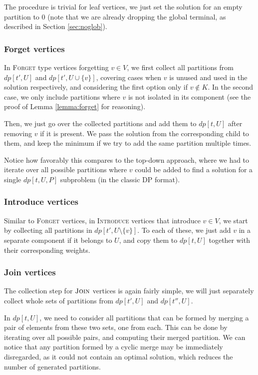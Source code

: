 \documentclass[thesis=M,english,hidelinks]{FITthesis}[2012/10/20]
\theoremstyle{definition}
\begin{document}
The procedure is trivial for leaf vertices, we just set the solution for an empty partition to 0 (note that we are
already dropping the global terminal, as described in Section \ref{sec:noglob}).

\subsubsection*{Forget vertices}

In \textsc{Forget} type vertices forgetting $v \in V$, we first collect all partitions from $dp[t', U]$ and $dp[t', U
\cup \{v\}]$, covering cases when $v$ is unused and used in the solution respectively, and considering the first option
only if $v \notin K$. In the second case, we only include partitions where $v$ is not isolated in its component (see the
proof of Lemma \ref{lemma:forget} for reasoning).

Then, we just go over the collected partitions and add them to $dp[t, U]$ after removing $v$ if it is present. We pass
the solution from the corresponding child to them, and keep the minimum if we try to add the same partition multiple
times.

Notice how favorably this compares to the top-down approach, where we had to iterate over all possible partitions where
$v$ could be added to find a solution for a single $dp[t, U, P]$ subproblem (in the classic DP format).

\subsubsection*{Introduce vertices}

Similar to \textsc{Forget} vertices, in \textsc{Introduce} vertices that introduce $v \in V$, we start by collecting all
partitions in $dp[t', U \setminus \{v\}]$. To each of these, we just add $v$ in a separate component if it belongs to
$U$, and copy them to $dp[t, U]$ together with their corresponding weights.

\subsubsection*{Join vertices}

The collection step for $\textsc{Join}$ vertices is again fairly simple, we will just separately collect whole sets of
partitions from $dp[t', U]$ and $dp[t'', U]$.

In $dp[t, U]$, we need to consider all partitions that can be formed by merging a pair of elements from these two sets,
one from each. This can be done by iterating over all possible pairs, and computing their merged partition. We can notice
that any partition formed by a cyclic merge may be immediately disregarded, as it could not contain an optimal solution,
which reduces the number of generated partitions.
\end{document}
